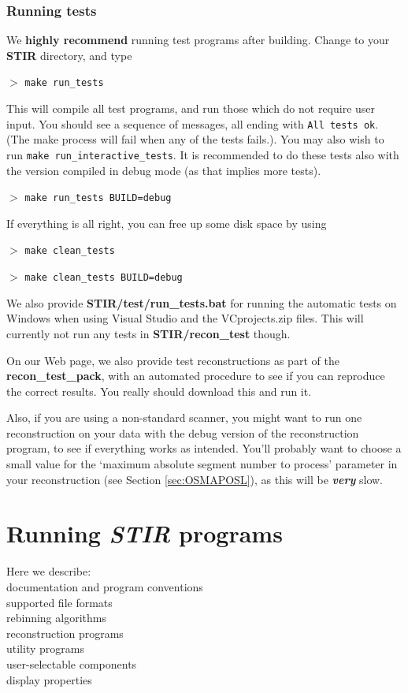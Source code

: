 \documentclass{article}
\newcommand{\cmdline}[1]{\par \noindent $>$ \texttt{#1}\par}
\begin{document}
\subsubsection{
Running tests}

We \textbf{highly recommend} running test programs after building. Change 
to your \textbf{STIR} directory, and type
\cmdline{make run\_tests}


This will compile all test programs, and run those which do not 
require user input. You should see a sequence of messages, all 
ending with \texttt{All tests ok}. (The make process will fail 
when any of the tests fails.). You may also wish to run \texttt{make 
run\_interactive\_tests}. It is recommended to do these tests 
also with the version compiled in debug mode (as that implies 
more tests). 
\cmdline{make run\_tests BUILD=debug}


If everything is all right, you can free up some disk space by 
using
\cmdline{make clean\_tests}
\cmdline{make clean\_tests BUILD=debug}

We also provide \textbf{STIR/test/run\_tests.bat} for running the automatic 
tests on Windows when using Visual Studio and the VCprojects.zip 
files. This will currently not run any tests in \textbf{STIR/recon\_test} though.


On our Web page, we also provide test reconstructions as part of the
\textbf{recon\_test\_pack}, with an 
automated procedure to see if you can reproduce the correct results. 
You really should download this and run it.


Also, if you are using a non-standard scanner, 
you might want to run one reconstruction on your data with 
the debug version of the reconstruction program, to see if everything 
works as intended. You'll probably want to choose a small value 
for the `maximum absolute segment number to process' parameter 
in your reconstruction (see Section \ref{sec:OSMAPOSL}), as this will be \textbf{\textit{very}} 
slow.


\section{
Running \textit{STIR} programs}

Here we describe:\\
{\textbullet} documentation and program conventions\\
{\textbullet} supported file formats \\
{\textbullet} rebinning algorithms\\
{\textbullet} reconstruction programs\\
{\textbullet} utility programs\\
{\textbullet} user-selectable components\\
{\textbullet} display properties
\end{document}
